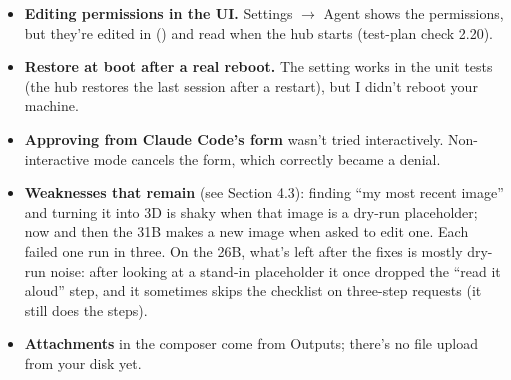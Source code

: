 \begin{itemize}[leftmargin=*]
\item \textbf{Editing permissions in the UI.} Settings $\rightarrow$ Agent shows the permissions, but they're edited in  () and read when the hub starts (test-plan check 2.20).
\item \textbf{Restore at boot after a real reboot.} The setting works in the unit tests (the hub restores the last session after a restart), but I didn't reboot your machine.
\item \textbf{Approving from Claude Code's form} wasn't tried interactively. Non-interactive mode cancels the form, which correctly became a denial.
\item \textbf{Weaknesses that remain} (see Section 4.3): finding ``my most recent image'' and turning it into 3D is shaky when that image is a dry-run placeholder; now and then the 31B makes a new image when asked to edit one. Each failed one run in three. On the 26B, what's left after the fixes is mostly dry-run noise: after looking at a stand-in placeholder it once dropped the ``read it aloud'' step, and it sometimes skips the checklist on three-step requests (it still does the steps).
\item \textbf{Attachments} in the composer come from Outputs; there's no file upload from your disk yet.
\end{itemize}
